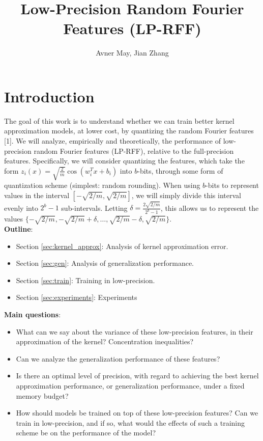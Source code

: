 \documentclass[12pt]{article}
\begin{document}
\title{Low-Precision Random Fourier Features (LP-RFF)}
\author{Avner May, Jian Zhang}
\onehalfspacing
\maketitle

\section{Introduction}
\label{sec:intro}
The goal of this work is to understand whether we can train better kernel approximation models, at lower cost,
by quantizing the random Fourier features [1].  We will analyze, empirically and theoretically, the performance of low-precision random Fourier features (LP-RFF), relative to the full-precision features.  Specifically, we will consider quantizing the features, which take the form $z_i(x) = \sqrt{\frac{2}{m}} \cos(w_i^Tx+b_i)$ into $b$-bits, through some form of quantization scheme (simplest: random rounding). 
When using $b$-bits to represent values in the interval $[-\sqrt{2/m},\sqrt{2/m}]$, we will simply divide this interval evenly into $2^b-1$ sub-intervals.  Letting $\delta = \frac{2\sqrt{2/m}}{2^b-1}$, this allows us to represent the values $\{-\sqrt{2/m},-\sqrt{2/m} + \delta,\ldots,\sqrt{2/m}-\delta, \sqrt{2/m}\}$. \\

\noindent \textbf{Outline}:
\begin{itemize}
	\item Section \ref{sec:kernel_approx}: Analysis of kernel approximation error.
	\item Section \ref{sec:gen}: Analysis of generalization performance.
	\item Section \ref{sec:train}: Training in low-precision.
	\item Section \ref{sec:experiments}: Experiments
\end{itemize}

\noindent \textbf{Main questions}:
\begin{itemize}
	\item What can we say about the variance of these low-precision features, in their approximation of the kernel?  Concentration inequalities?
	\item Can we analyze the generalization performance of these features?
	\item Is there an optimal level of precision, with regard to achieving the best kernel approximation performance, or generalization performance, under a fixed memory budget?
	\item How should models be trained on top of these low-precision features? Can we train in low-precision, and if so, what would the effects of such a training scheme be on the performance of the model?
\end{itemize}
\end{document}
